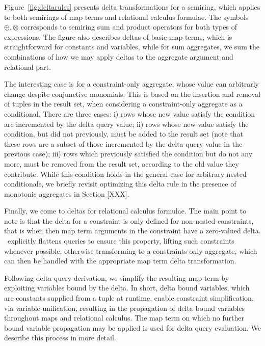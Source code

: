 Figure~\ref{fig:deltarules} presents delta transformations for a semiring, which
applies to both semirings of map terms and relational calculus formulae. The
symbols $\oplus, \otimes$ corresponds to semiring sum and product operators for
both types of expressions. The figure also describes deltas of basic map terms,
which is straightforward for constants and variables, while for sum aggregates,
we sum the combinations of how we may apply deltas to the aggregate argument and
relational part.

The interesting case is for a constraint-only aggregate, whose value can
arbitrarly change despite conjunctive monomials. This is based on the insertion
and removal of tuples in the result set, when considering a constraint-only
aggregate as a conditional. There are three cases:
i) rows whose new value satisfy the condition are
  incremented by the delta query value;
ii) rows whose new value satisfy the condition, but did not previously, must
  be added to the result set (note that these rows are a subset of those
  incremented by the delta query value in the previous case);
iii) rows which previously satisfied the condition but do not any more, must be
  removed from the result set, according to the old value they contribute.
While this condition holds in the general case for arbitrary nested
conditionals, we briefly revisit optimizing this delta rule in the presence of
monotonic aggregates in Section [XXX].

Finally, we come to deltas for relational calculus formulae. The main point to
note is that the delta for a constraint is only defined for non-nested
constraints, that is when then map term arguments in the constraint have a
zero-valued delta. \compiler\ explicitly flattens queries to ensure this
property, lifting such constraints whenever possible, otherwise transforming to
a constraints-only aggregate, which can then be handled with the appropriate map
term delta transformation.


Following delta query derivation, we simplify the resulting map term by
exploiting variables bound by the delta. In short, delta bound variables, which
are constants supplied from a tuple at runtime, enable constraint
simplification, via variable unification, resulting in the propagation of delta
bound variables throughout maps and relational calculus. The map term
on which no further bound variable propagation may be applied is used for delta
query evaluation. We describe this process in more detail.

